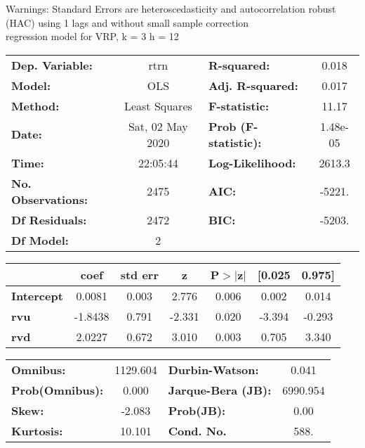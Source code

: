 Warnings: \newline
 [1] Standard Errors are heteroscedasticity and autocorrelation robust (HAC) using 1 lags and without small sample correction\\ 

regression model for VRP, k = 3 h = 12\begin{center}
\begin{tabular}{lclc}
\toprule
\textbf{Dep. Variable:}    &       rtrn       & \textbf{  R-squared:         } &     0.018   \\
\textbf{Model:}            &       OLS        & \textbf{  Adj. R-squared:    } &     0.017   \\
\textbf{Method:}           &  Least Squares   & \textbf{  F-statistic:       } &     11.17   \\
\textbf{Date:}             & Sat, 02 May 2020 & \textbf{  Prob (F-statistic):} &  1.48e-05   \\
\textbf{Time:}             &     22:05:44     & \textbf{  Log-Likelihood:    } &    2613.3   \\
\textbf{No. Observations:} &        2475      & \textbf{  AIC:               } &    -5221.   \\
\textbf{Df Residuals:}     &        2472      & \textbf{  BIC:               } &    -5203.   \\
\textbf{Df Model:}         &           2      & \textbf{                     } &             \\
\bottomrule
\end{tabular}
\begin{tabular}{lcccccc}
                   & \textbf{coef} & \textbf{std err} & \textbf{z} & \textbf{P$> |$z$|$} & \textbf{[0.025} & \textbf{0.975]}  \\
\midrule
\textbf{Intercept} &       0.0081  &        0.003     &     2.776  &         0.006        &        0.002    &        0.014     \\
\textbf{rvu}       &      -1.8438  &        0.791     &    -2.331  &         0.020        &       -3.394    &       -0.293     \\
\textbf{rvd}       &       2.0227  &        0.672     &     3.010  &         0.003        &        0.705    &        3.340     \\
\bottomrule
\end{tabular}
\begin{tabular}{lclc}
\textbf{Omnibus:}       & 1129.604 & \textbf{  Durbin-Watson:     } &    0.041  \\
\textbf{Prob(Omnibus):} &   0.000  & \textbf{  Jarque-Bera (JB):  } & 6990.954  \\
\textbf{Skew:}          &  -2.083  & \textbf{  Prob(JB):          } &     0.00  \\
\textbf{Kurtosis:}      &  10.101  & \textbf{  Cond. No.          } &     588.  \\
\bottomrule
\end{tabular}
\end{center}

